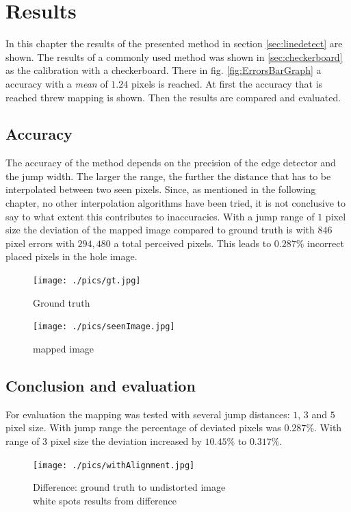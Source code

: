 \documentclass[journal,final,a4paper,twoside]{PS}
\begin{document}
\section{Results}
\label{sec:results}
In this chapter the results of the presented method in section \ref{sec:linedetect} are shown. The results of a commonly used method was shown in \ref{sec:checkerboard} as the calibration with a checkerboard. There in fig. \ref{fig:ErrorsBarGraph} a accuracy with a \emph{mean} of $1.24$ pixels is reached. At first the accuracy that is reached threw mapping is shown. Then the results are compared and evaluated.
\subsection{Accuracy}

The accuracy of the method depends on the precision of the edge detector and the jump width. The larger the range, the further the distance that has to be interpolated between two seen pixels. Since, as mentioned in the following chapter, no other interpolation algorithms have been tried, it is not conclusive to say to what extent this contributes to inaccuracies. With a jump range of $1$ pixel size the deviation of the mapped image compared to ground truth is with $846$ pixel errors with $294,480$ a total perceived pixels. This leads to $0.287\%$ incorrect placed pixels in the hole image.

\begin{figure}[h]
\centering
\parbox{4cm}{
\texttt{[image: ./pics/gt.jpg]}
\caption{Ground truth}
\label{fig:gt}}
\qquad
\begin{minipage}{4cm}
\texttt{[image: ./pics/seenImage.jpg]}
\caption{mapped image}
\label{fig:undistImage}
\end{minipage}
\end{figure}



\subsection{Conclusion and evaluation}
\label{sec:conclusion}
For evaluation the mapping was tested with several jump distances: $1$, $3$ and $5$ pixel size. With jump range the percentage of deviated pixels was $0.287\%$. With range of $3$ pixel size the deviation increased by $10.45\%$ to $0.317\%$.

\begin{figure}[h]
\begin{center}
\texttt{[image: ./pics/withAlignment.jpg]}
\caption{Difference: ground truth to undistorted image\\ white spots results from difference}
\label{fig:diff}
\end{center}
\end{figure}
\end{document}
